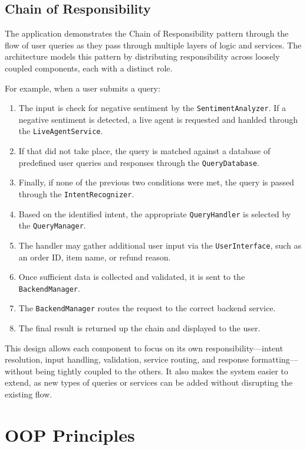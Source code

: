 \documentclass[11pt]{article}
\begin{document}
\subsection{Chain of Responsibility}
The application demonstrates the Chain of Responsibility pattern through the flow of user queries as they pass through multiple layers of logic and services. The architecture models this pattern by distributing responsibility across loosely coupled components, each with a distinct role.

For example, when a user submits a query:
\begin{enumerate}
	\item The input is check for negative sentiment by the \texttt{SentimentAnalyzer}. If a negative sentiment is detected, a live agent is requested and hanlded through the \texttt{LiveAgentService}.
	\item If that did not take place, the query is matched against a database of predefined user queries and responses through the \texttt{QueryDatabase}.
    \item Finally, if none of the previous two conditions were met, the query is passed through the \texttt{IntentRecognizer}.
    \item Based on the identified intent, the appropriate \texttt{QueryHandler} is selected by the \texttt{QueryManager}.
    \item The handler may gather additional user input via the \texttt{UserInterface}, such as an order ID, item name, or refund reason.
    \item Once sufficient data is collected and validated, it is sent to the \texttt{BackendManager}.
    \item The \texttt{BackendManager} routes the request to the correct backend service.
    \item The final result is returned up the chain and displayed to the user.
\end{enumerate}

\noindent
This design allows each component to focus on its own responsibility—intent resolution, input handling, validation, service routing, and response formatting—without being tightly coupled to the others. It also makes the system easier to extend, as new types of queries or services can be added without disrupting the existing flow.
\section{OOP Principles}
\end{document}
